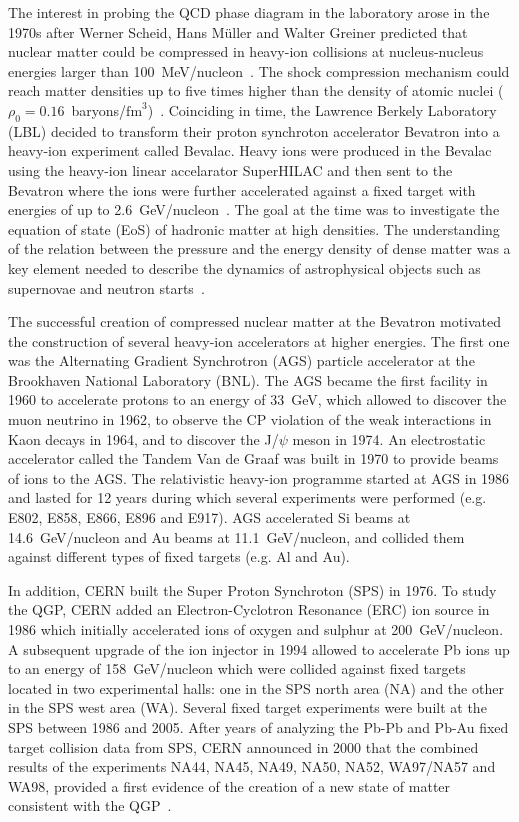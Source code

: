 The interest in probing the QCD phase diagram in the laboratory arose in the 1970s after Werner Scheid, Hans M{\"u}ller and Walter Greiner predicted that nuclear matter could be compressed in heavy-ion collisions at nucleus-nucleus energies larger than 100~\si{\MeV}/nucleon~\cite{MatterShock}. The shock compression mechanism could reach matter densities up to five times higher than the density of atomic nuclei ($\rho_{0}=0.16$~baryons/$\mathrm{fm}^{3}$)~\cite{MatterShock}. Coinciding in time, the Lawrence Berkely Laboratory (LBL) decided to transform their proton synchroton accelerator Bevatron into a heavy-ion experiment called Bevalac. Heavy ions were produced in the Bevalac using the heavy-ion linear accelarator SuperHILAC and then sent to the Bevatron where the ions were further accelerated against a fixed target with energies of up to 2.6~\si{\GeV}/nucleon~\cite{Bevalac}. The goal at the time was to investigate the equation of state (EoS) of hadronic matter at high densities. The understanding of the relation between the pressure and the energy density of dense matter was a key element needed to describe the dynamics of astrophysical objects such as supernovae and neutron starts~\cite{NeutronStar, DenseMatter}.

The successful creation of compressed nuclear matter at the Bevatron motivated the construction of several heavy-ion accelerators at higher energies. The first one was the Alternating Gradient Synchrotron (AGS) particle accelerator at the Brookhaven National Laboratory (BNL). The AGS became the first facility in 1960 to accelerate protons to an energy of 33~\si{\GeV}, which allowed to discover the muon neutrino in 1962, to observe the CP violation of the weak interactions in Kaon decays in 1964, and to discover the J/$\psi$ meson in 1974. An electrostatic accelerator called the Tandem Van de Graaf was built in 1970 to provide beams of ions to the AGS. The relativistic heavy-ion programme started at AGS in 1986 and lasted for 12 years during which several experiments were performed (e.g. E802, E858, E866, E896 and E917). AGS accelerated Si beams at 14.6~\si{\GeV}/nucleon and Au beams at 11.1~\si{\GeV}/nucleon, and collided them against different types of fixed targets (e.g. Al and Au).

In addition, CERN built the Super Proton Synchroton (SPS) in 1976. To study the QGP, CERN added an Electron-Cyclotron Resonance (ERC) ion source in 1986 which initially accelerated ions of oxygen and sulphur at 200~\si{\GeV}/nucleon. A subsequent upgrade of the ion injector in 1994 allowed to accelerate Pb ions up to an energy of 158~\si{\GeV}/nucleon which were collided against fixed targets located in two experimental halls: one in the SPS north area (NA) and the other in the SPS west area (WA). Several fixed target experiments were built at the SPS between 1986 and 2005. After years of analyzing the Pb-Pb and Pb-Au fixed target collision data from SPS, CERN announced in 2000 that the combined results of the experiments NA44, NA45, NA49, NA50, NA52, WA97/NA57 and WA98, provided a first evidence of the creation of a new state of matter consistent with the QGP~\cite{SPSQGP}.

